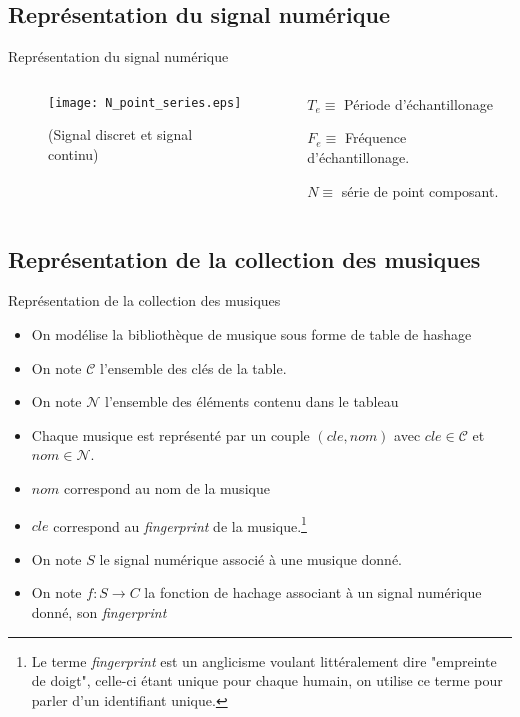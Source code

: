 \documentclass[10pt]{beamer}
\begin{document}
\subsection{Représentation du signal numérique}
\begin{frame}{Représentation du signal numérique}
\begin{columns}
\begin{column}{0.5\textwidth}	
\begin{figure}
	\texttt{[image: N\_point\_series.eps]}
	 \caption{(Signal discret et signal continu)}
\end{figure}
\end{column}
\begin{column}{0.5\textwidth}	
	$T_e\equiv$ Période d'échantillonage
	
	$F_e\equiv$ Fréquence d'échantillonage.
	
	$N\equiv$ série de point composant.
\end{column}

\end{columns}
\end{frame}
\subsection{Représentation de la collection des musiques}
\begin{frame}{Représentation de la collection des musiques}
	\begin{itemize}
		\item On modélise la bibliothèque de musique sous forme de table de hashage
		\item On note $\mathcal{C}$ l'ensemble des clés de la table.
		\item On note $\mathcal{N}$ l'ensemble des éléments contenu dans le tableau
		\item Chaque musique est représenté par un couple $(cle,nom)$ avec $cle \in \mathcal{C}$ et $nom \in \mathcal{N}$.
		\item $nom$ correspond au nom de la musique
		\item $cle$ correspond au \textit{fingerprint} de la musique.\footnote{Le terme \textit{fingerprint} est un anglicisme voulant littéralement dire "empreinte de doigt", celle-ci étant unique pour chaque humain, on utilise ce terme pour parler d'un identifiant unique.}
		\item On note $S$ le signal numérique associé à une musique donné.
		\item On note $f:S\to C$ la fonction de hachage associant à un signal numérique donné, son \textit{fingerprint}
	\end{itemize}
\end{frame}
\end{document}
